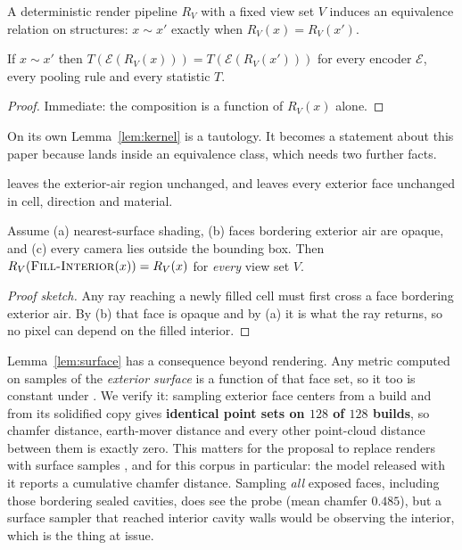 A deterministic render pipeline $R_V$ with a fixed view set $V$ induces an
equivalence relation on structures: $x \sim x'$ exactly when
$R_V(x) = R_V(x')$.

\begin{lemma}\label{lem:kernel}
If $x \sim x'$ then $T(\mathcal{E}(R_V(x))) = T(\mathcal{E}(R_V(x')))$ for every
encoder $\mathcal{E}$, every pooling rule and every statistic $T$.
\end{lemma}
\begin{proof}
Immediate: the composition is a function of $R_V(x)$ alone.
\end{proof}

On its own Lemma~\ref{lem:kernel} is a tautology. It becomes a statement about
this paper because \solidify{} lands inside an equivalence class, which needs
two further facts.

\begin{lemma}\label{lem:surface}
\solidify{} leaves the exterior-air region unchanged, and leaves every exterior
face unchanged in cell, direction and material.
\end{lemma}

\begin{lemma}[Occlusion]\label{lem:occl}
Assume (a) nearest-surface shading, (b) faces bordering exterior air are opaque,
and (c) every camera lies outside the bounding box. Then
$R_V(\mbox{\textsc{Fill-Interior}}(x)) = R_V(x)$ for \emph{every} view set $V$.
\end{lemma}
\begin{proof}[Proof sketch]
Any ray reaching a newly filled cell must first cross a face bordering exterior
air. By (b) that face is opaque and by (a) it is what the ray returns, so no
pixel can depend on the filled interior.
\end{proof}

Lemma~\ref{lem:surface} has a consequence beyond rendering. Any metric computed
on samples of the \emph{exterior surface} is a function of that face set, so it
too is constant under \solidify{}. We verify it: sampling exterior face centers
from a build and from its solidified copy gives \textbf{identical point sets on
$128$ of $128$ builds}, so chamfer distance, earth-mover distance and every
other point-cloud distance between them is exactly zero. This matters for the
proposal to replace renders with surface samples
\citep{luan2026rendermetric}, and for this corpus in particular: the model
released with it \citep{chen2019voxelcnn} reports a cumulative chamfer distance.
Sampling \emph{all} exposed faces, including those bordering sealed cavities,
does see the probe (mean chamfer $0.485$), but a surface sampler that reached
interior cavity walls would be observing the interior, which is the thing at
issue.


